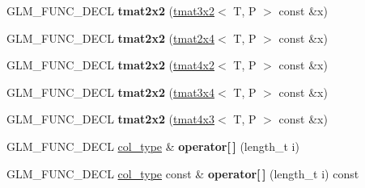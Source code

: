 \begin{DoxyCompactItemize}
\item 
\hypertarget{structglm_1_1detail_1_1tmat2x2_a4f224e4deddcbcd9f4b3109b595429e6}{G\-L\-M\-\_\-\-F\-U\-N\-C\-\_\-\-D\-E\-C\-L {\bfseries tmat2x2} (\hyperlink{structglm_1_1detail_1_1tmat3x2}{tmat3x2}$<$ T, P $>$ const \&x)}\label{structglm_1_1detail_1_1tmat2x2_a4f224e4deddcbcd9f4b3109b595429e6}

\item 
\hypertarget{structglm_1_1detail_1_1tmat2x2_ad9aa5899db04b6c8d78d31ebea8ea4c6}{G\-L\-M\-\_\-\-F\-U\-N\-C\-\_\-\-D\-E\-C\-L {\bfseries tmat2x2} (\hyperlink{structglm_1_1detail_1_1tmat2x4}{tmat2x4}$<$ T, P $>$ const \&x)}\label{structglm_1_1detail_1_1tmat2x2_ad9aa5899db04b6c8d78d31ebea8ea4c6}

\item 
\hypertarget{structglm_1_1detail_1_1tmat2x2_a124fb38aa5a54a8c912e5612b69aabd8}{G\-L\-M\-\_\-\-F\-U\-N\-C\-\_\-\-D\-E\-C\-L {\bfseries tmat2x2} (\hyperlink{structglm_1_1detail_1_1tmat4x2}{tmat4x2}$<$ T, P $>$ const \&x)}\label{structglm_1_1detail_1_1tmat2x2_a124fb38aa5a54a8c912e5612b69aabd8}

\item 
\hypertarget{structglm_1_1detail_1_1tmat2x2_a197a18fc9c265eb65da1bc0df80224cf}{G\-L\-M\-\_\-\-F\-U\-N\-C\-\_\-\-D\-E\-C\-L {\bfseries tmat2x2} (\hyperlink{structglm_1_1detail_1_1tmat3x4}{tmat3x4}$<$ T, P $>$ const \&x)}\label{structglm_1_1detail_1_1tmat2x2_a197a18fc9c265eb65da1bc0df80224cf}

\item 
\hypertarget{structglm_1_1detail_1_1tmat2x2_ad9dc3f0b215226f11ba9214e456f69ec}{G\-L\-M\-\_\-\-F\-U\-N\-C\-\_\-\-D\-E\-C\-L {\bfseries tmat2x2} (\hyperlink{structglm_1_1detail_1_1tmat4x3}{tmat4x3}$<$ T, P $>$ const \&x)}\label{structglm_1_1detail_1_1tmat2x2_ad9dc3f0b215226f11ba9214e456f69ec}

\item 
\hypertarget{structglm_1_1detail_1_1tmat2x2_a3eccfee40595e7b8023755e5d41ed0fe}{G\-L\-M\-\_\-\-F\-U\-N\-C\-\_\-\-D\-E\-C\-L \hyperlink{structglm_1_1detail_1_1tvec2}{col\-\_\-type} \& {\bfseries operator\mbox{[}$\,$\mbox{]}} (length\-\_\-t i)}\label{structglm_1_1detail_1_1tmat2x2_a3eccfee40595e7b8023755e5d41ed0fe}

\item 
\hypertarget{structglm_1_1detail_1_1tmat2x2_af48c3a162bf1db72b989af5e5619d1d6}{G\-L\-M\-\_\-\-F\-U\-N\-C\-\_\-\-D\-E\-C\-L \hyperlink{structglm_1_1detail_1_1tvec2}{col\-\_\-type} const \& {\bfseries operator\mbox{[}$\,$\mbox{]}} (length\-\_\-t i) const }\label{structglm_1_1detail_1_1tmat2x2_af48c3a162bf1db72b989af5e5619d1d6}


\end{DoxyCompactItemize}
